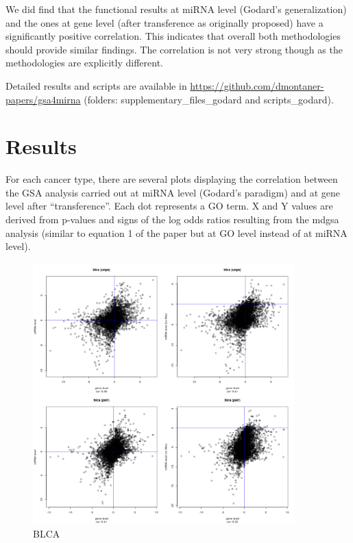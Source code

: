 \documentclass[a4paper,12pt]{article}
\begin{document}
We did find that the functional results at miRNA level (Godard’s generalization) and the ones at gene level (after transference as originally proposed)
have a significantly positive correlation. This indicates that overall both methodologies should provide
similar findings. The correlation is not very strong though as the methodologies are explicitly different.

Detailed results and scripts are available in \url{https://github.com/dmontaner-papers/gsa4mirna}
(folders: supplementary\_files\_godard and scripts\_godard).


\clearpage



\section{Results}

For each cancer type, there are several plots displaying the correlation between the GSA analysis carried out at miRNA level (Godard’s paradigm)
 and at gene level after “transference”. Each dot represents a GO term. 
 X and Y values are derived from p-values and signs of the log odds ratios resulting from the mdgsa analysis
  (similar to equation 1 of the paper but at GO level instead of at miRNA level).

  
  
\begin{figure}[!h] 
\centering 
\includegraphics[width=0.9\textwidth]{plots/gene_vs_mirna_level_gsa_blca.png} 
\caption{BLCA} 
\end{figure} 
\end{document}
